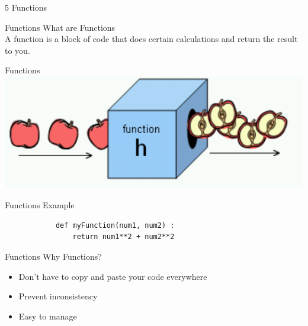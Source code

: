 \documentclass{beamer}
\begin{document}
    \begin{frame}[plain, c]
        \begin{center}
            \color{blue} \LARGE 5 Functions
        \end{center}
    \end{frame}
    
    \begin{frame}{Functions}
        \color{blue} \Large What are Functions \\
        \color{black} \normalsize \vskip 5pt
        A function is a block of code that does certain calculations and return the result to you.\\
    \end{frame}
    
    \begin{frame}{Functions}
        \includegraphics[scale = 0.7]{Functions.png}
    \end{frame}
    
    \begin{frame}[fragile]{Functions}
        \color{blue} \Large Example \\
        \color{black} \normalsize \vskip 5pt
        \begin{verbatim}
            def myFunction(num1, num2) :
                return num1**2 + num2**2
        \end{verbatim}
    \end{frame}
    
    \begin{frame}{Functions}
        \color{blue} \Large Why Functions? \\
        \color{black} \normalsize \vskip 5pt
        \begin{itemize}
            \item Don't have to copy and paste your code everywhere
            \item Prevent inconsistency
            \item Easy to manage
        \end{itemize}
    \end{frame}
\end{document}
